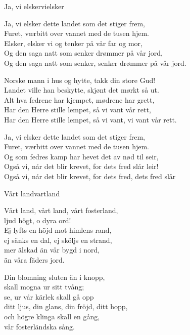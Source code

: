 \begin{song}{Ja, vi elsker}{vielsker}
\begin{vers}
Ja, vi elsker dette landet som det stiger frem,\\
Furet, værbitt over vannet med de tusen hjem.\\
Elsker, elsker vi og tenker på vår far og mor,\\
Og den saga natt som senker drømmer på vår jord,\\
Og den saga natt som senker, senker drømmer på vår jord.\\
\end{vers}
\begin{vers}
Norske mann i hus og hytte, takk din store Gud!\\
Landet ville han beskytte, skjønt det mørkt så ut.\\
Alt hva fedrene har kjempet, mødrene har grett,\\
Har den Herre stille lempet, så vi vant vår rett,\\
Har den Herre stille lempet, så vi vant, vi vant vår rett.\\
\end{vers}
\begin{vers}
Ja, vi elsker dette landet som det stiger frem,\\
Furet, værbitt over vannet med de tusen hjem.\\
Og som fedres kamp har hevet det av nød til seir,\\
Også vi, når det blir krevet, for dets fred slår leir!\\
Også vi, når det blir krevet, for dets fred, dets fred slår \\
\end{vers}
\end{song}

\newpage

\begin{song}{Vårt land}{vartland}
\begin{vers}
Vårt land, vårt land, vårt fosterland,\\
ljud högt, o dyra ord!\\
Ej lyfts en höjd mot himlens rand,\\
ej sänks en dal, ej sköljs en strand,\\
mer älskad än vår bygd i nord,\\
än våra fäders jord.\\
\end{vers}
\begin{vers}
Din blomning sluten än i knopp,\\
skall mogna ur sitt tvång;\\
se, ur vår kärlek skall gå opp\\
ditt ljus, din glans, din fröjd, ditt hopp,\\
och högre klinga skall en gång,\\
vår fosterländska sång.\\
\end{vers}
\end{song}


